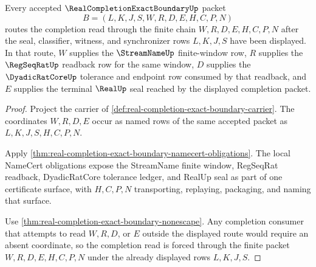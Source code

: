 \begin{theorem}
\label{thm:real-completion-exact-boundary-streamname-regseq-route}
Every accepted $\RealCompletionExactBoundaryUp$ packet
$$
B=(L,K,J,S,W,R,D,E,H,C,P,N)
$$
routes the completion read through the finite chain $W,R,D,E,H,C,P,N$ after the seal, classifier, witness, and synchronizer rows $L,K,J,S$ have been displayed. In that route, $W$ supplies the $\StreamNameUp$ finite-window row, $R$ supplies the $\RegSeqRatUp$ readback row for the same window, $D$ supplies the $\DyadicRatCoreUp$ tolerance and endpoint row consumed by that readback, and $E$ supplies the terminal $\RealUp$ seal reached by the displayed completion packet.
\end{theorem}
\begin{proof}
Project the carrier of \autoref{def:real-completion-exact-boundary-carrier}. The coordinates $W,R,D,E$ occur as named rows of the same accepted packet as $L,K,J,S,H,C,P,N$.

Apply \autoref{thm:real-completion-exact-boundary-namecert-obligations}. The local NameCert obligations expose the StreamName finite window, RegSeqRat readback, DyadicRatCore tolerance ledger, and RealUp seal as part of one certificate surface, with $H,C,P,N$ transporting, replaying, packaging, and naming that surface.

Use \autoref{thm:real-completion-exact-boundary-nonescape}. Any completion consumer that attempts to read $W,R,D$, or $E$ outside the displayed route would require an absent coordinate, so the completion read is forced through the finite packet $W,R,D,E,H,C,P,N$ under the already displayed rows $L,K,J,S$.
\end{proof}

